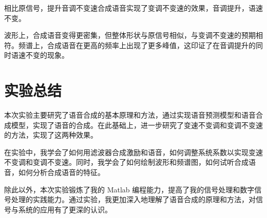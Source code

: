 \documentclass[a4paper]{article}  %
\begin{document}
相比原信号，提升音调不变速合成语音实现了变调不变速的效果，音调提升，语速不变。

波形上，合成语音变得更密集，但整体形状与原信号相似，与变调不变速的预期相符。频谱上，合成语音在更高的频率上出现了更多峰值，这印证了在音调提升的同时语速不变的现象。


\section{实验总结}

本次实验主要研究了语音合成的基本原理和方法，通过实现语音预测模型和语音合成模型，实现了语音的合成。在此基础上，进一步研究了变速不变调和变调不变速的方法，实现了这两种效果。

在实验中，我学会了如何用滤波器合成激励和语音，如何调整系统系数以实现变速不变调和变调不变速。同时，我学会了如何绘制波形和频谱图，如何试听合成语音，如何分析合成语音的特征。

除此以外，本次实验锻炼了我的 Matlab 编程能力，提高了我的信号处理和数字信号处理的实践能力。通过实验，我更加深入地理解了语音合成的原理和方法，对信号与系统的应用有了更深的认识。
\end{document}
